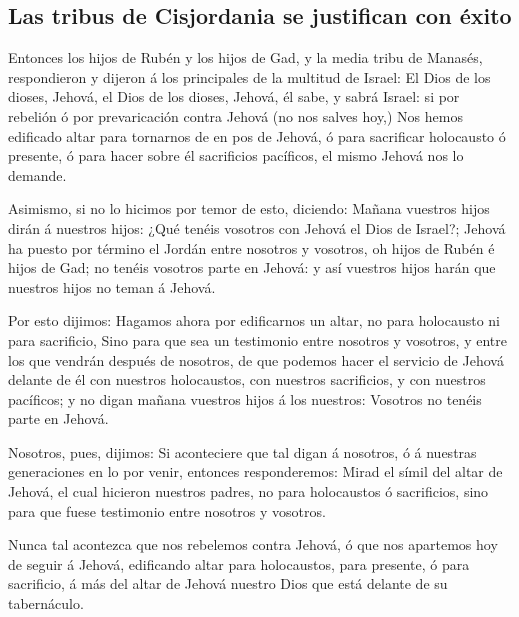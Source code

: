\hypertarget{las-tribus-de-cisjordania-se-justifican-con-uxe9xito}{%
\subsection{Las tribus de Cisjordania se justifican con
éxito}\label{las-tribus-de-cisjordania-se-justifican-con-uxe9xito}}

 Entonces los hijos de Rubén y los hijos de Gad, y la media
tribu de Manasés, respondieron y dijeron á los principales de la
multitud de Israel:  El Dios de los dioses, Jehová, el Dios
de los dioses, Jehová, él sabe, y sabrá Israel: si por rebelión ó por
prevaricación contra Jehová (no nos salves hoy,)  Nos hemos
edificado altar para tornarnos de en pos de Jehová, ó para sacrificar
holocausto ó presente, ó para hacer sobre él sacrificios pacíficos, el
mismo Jehová nos lo demande.

 Asimismo, si no lo hicimos por temor de esto, diciendo:
Mañana vuestros hijos dirán á nuestros hijos: ¿Qué tenéis vosotros con
Jehová el Dios de Israel?;  Jehová ha puesto por término el
Jordán entre nosotros y vosotros, oh hijos de Rubén é hijos de Gad; no
tenéis vosotros parte en Jehová: y así vuestros hijos harán que nuestros
hijos no teman á Jehová.

 Por esto dijimos: Hagamos ahora por edificarnos un altar,
no para holocausto ni para sacrificio,  Sino para que sea
un testimonio entre nosotros y vosotros, y entre los que vendrán después
de nosotros, de que podemos hacer el servicio de Jehová delante de él
con nuestros holocaustos, con nuestros sacrificios, y con nuestros
pacíficos; y no digan mañana vuestros hijos á los nuestros: Vosotros no
tenéis parte en Jehová.

 Nosotros, pues, dijimos: Si aconteciere que tal digan á
nosotros, ó á nuestras generaciones en lo por venir, entonces
responderemos: Mirad el símil del altar de Jehová, el cual hicieron
nuestros padres, no para holocaustos ó sacrificios, sino para que fuese
testimonio entre nosotros y vosotros.

 Nunca tal acontezca que nos rebelemos contra Jehová, ó que
nos apartemos hoy de seguir á Jehová, edificando altar para holocaustos,
para presente, ó para sacrificio, á más del altar de Jehová nuestro Dios
que está delante de su tabernáculo.

